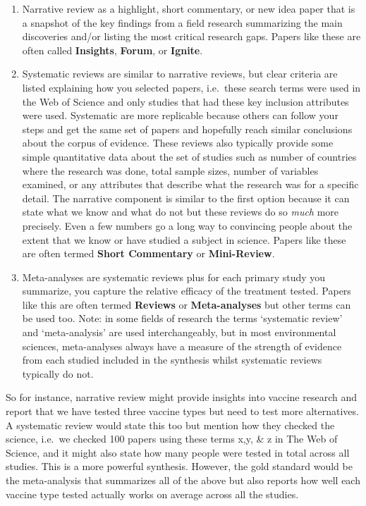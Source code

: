 \documentclass[
]{book}
\begin{document}
\begin{enumerate}
\def\labelenumi{(\arabic{enumi})}
\item
  Narrative review as a highlight, short commentary, or new idea paper that is a snapshot of the key findings from a field research summarizing the main discoveries and/or listing the most critical research gaps. Papers like these are often called \textbf{Insights}, \textbf{Forum}, or \textbf{Ignite}.
\item
  Systematic reviews are similar to narrative reviews, but clear criteria are listed explaining how you selected papers, i.e.~these search terms were used in the Web of Science and only studies that had these key inclusion attributes were used. Systematic are more replicable because others can follow your steps and get the same set of papers and hopefully reach similar conclusions about the corpus of evidence. These reviews also typically provide some simple quantitative data about the set of studies such as number of countries where the research was done, total sample sizes, number of variables examined, or any attributes that describe what the research was for a specific detail. The narrative component is similar to the first option because it can state what we know and what do not but these reviews do so \emph{much} more precisely. Even a few numbers go a long way to convincing people about the extent that we know or have studied a subject in science. Papers like these are often termed \textbf{Short Commentary} or \textbf{Mini-Review}.
\item
  Meta-analyses are systematic reviews plus for each primary study you summarize, you capture the relative efficacy of the treatment tested. Papers like this are often termed \textbf{Reviews} or \textbf{Meta-analyses} but other terms can be used too. Note: in some fields of research the terms `systematic review' and `meta-analysis' are used interchangeably, but in most environmental sciences, meta-analyses always have a measure of the strength of evidence from each studied included in the synthesis whilst systematic reviews typically do not.
\end{enumerate}

So for instance, narrative review might provide insights into vaccine research and report that we have tested three vaccine types but need to test more alternatives. A systematic review would state this too but mention how they checked the science, i.e.~we checked 100 papers using these terms x,y, \& z in The Web of Science, and it might also state how many people were tested in total across all studies. This is a more powerful synthesis. However, the gold standard would be the meta-analysis that summarizes all of the above but also reports how well each vaccine type tested actually works on average across all the studies.
\end{document}
